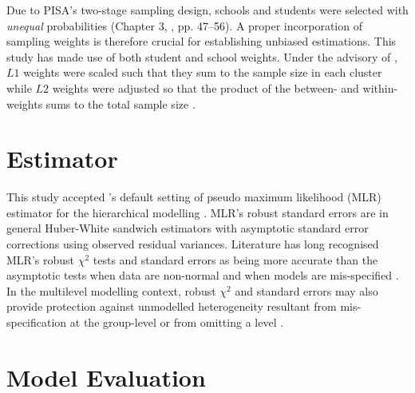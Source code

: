 \documentclass[a4paper,11pt,UKenglish,twoside,openright]{report}\usepackage[]{graphicx}\usepackage[]{color}
\begin{document}
Due to PISA's two-stage sampling design, schools and students were selected with \emph{unequal} probabilities (Chapter 3, \textcite{PISAspss}, pp. 47--56). A proper incorporation of sampling weights is therefore crucial for establishing unbiased estimations. This study has made use of both student and school weights. Under the advisory of \textcite{asparouhov:2006}, $L1$ weights were scaled such that they sum to the sample size in each cluster while $L2$ weights were adjusted so that the product of the between- and within-weights sums to the total sample size \parencite[][pp. 622--624]{mplus:manual}.

\section{Estimator}\label{sec:mlr}

This study accepted \CM's default setting of pseudo maximum likelihood (MLR) estimator for the hierarchical modelling \parencite[Chapter 16,][pp. 666 \& 668]{mplus:manual}. MLR's robust standard errors are in general Huber-White sandwich estimators \parencite{huber:1967, white:1982} with asymptotic standard error corrections using observed residual variances. Literature has long recognised MLR's robust $\chi^2$ tests and standard errors as being more accurate than the asymptotic tests when data are non-normal and when models are mis-specified \parencite{chou:1991, curran:1996}. In the multilevel modelling context, robust $\chi^2$ and standard errors may also provide protection against unmodelled heterogeneity resultant from mis-specification at the group-level or from omitting a level \parencite{hox:2010}.

\section{Model Evaluation}
\end{document}
